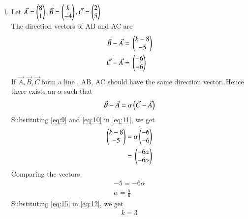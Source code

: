 \documentclass[journal,12pt,twocolumn]{IEEEtran}
\begin{document}
\begin{enumerate}
\item Let $\Vec{A}=\begin{pmatrix}8\\1\end{pmatrix}, \Vec{B}=\begin{pmatrix}k \\ -4\end{pmatrix}, \Vec{C}=\begin{pmatrix}2 \\ 5\end{pmatrix}$\\
The direction vectors of AB and AC are
\begin{align}
\label{eq:9}
\Vec{B} - \Vec{A} ={}& \begin{pmatrix}k-8\\-5\end{pmatrix}\\
\label{eq:10}
\Vec{C} - \Vec{A} ={}& \begin{pmatrix}-6 \\ -6\end{pmatrix}
\end{align}
If $\Vec{A}, \Vec{B},\Vec{C} $ form a line , AB, AC should have the same direction vector. Hence there exists an $\alpha$  such that
\begin{align}
\label{eq:11}
\Vec{B} - \Vec{A}=\alpha \left(\Vec{C} - \Vec{A}\right)
\end{align}
Substituting \eqref{eq:9} and \eqref{eq:10} in \eqref{eq:11}, we get
\begin{align}
\label{eq:12}
\begin{pmatrix}k-8\\-5\end{pmatrix}={}&\alpha \begin{pmatrix}-6 \\ -6\end{pmatrix}\\
\label{eq:13}
={}&\begin{pmatrix}-6\alpha \\ -6\alpha\end{pmatrix}
\end{align}
Comparing the vectors
\begin{align}
\label{eq:14}
-5=-6\alpha\\
\label{eq:15}
\alpha=\frac{5}{6}
\end{align}
Substituting \eqref{eq:15} in \eqref{eq:12}, we get 
\begin{align}
k=3
\end{align}

\end{enumerate}
\end{document}
